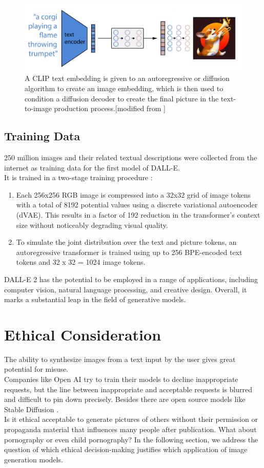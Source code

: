 \documentclass[11pt]{article}
\begin{document}
\begin{figure} [h]
	\includegraphics[width = 1\linewidth]{images/highLevel.png}
	\caption{A CLIP text embedding is given to an autoregressive or diffusion algorithm to create an image embedding, which is then used to condition a diffusion decoder to create the final picture in the text-to-image production process.[modified from \cite{CLIP}]}
	\label{example}
\end{figure}

\subsection{Training Data}
250 million images and their related textual descriptions were collected from the internet as training data for the first model of DALL-E.\\
It is trained in a two-stage training procedure \cite{zeroShot}:
\begin{enumerate}
	\item Each 256x256 RGB image is compressed into a 32x32 grid of image tokens with a total of 8192 potential values using a discrete variational autoencoder (dVAE). This results in a factor of 192 reduction in the transformer's context size without noticeably degrading visual quality.
	\item To simulate the joint distribution over the text and picture tokens, an autoregressive transformer is trained using up to 256 BPE-encoded text tokens and 32 x 32 = 1024 image tokens.
\end{enumerate}
DALL-E 2 has the potential to be employed in a range of applications, including computer vision, natural language processing, and creative design. Overall, it marks a substantial leap in the field of generative models.


\section{Ethical Consideration}
The ability to synthesize images from a text input by the user gives great potential for misuse. \\
Companies like Open AI try to train their models to decline inappropriate requests, but the line between inappropriate and acceptable requests is blurred and difficult to pin down precisely. Besides there are open source models like Stable Diffusion \cite{StableDiffusion}.\\
Is it ethical acceptable to generate pictures of others without their permission or propaganda material that influences many people after publication. What about pornography or even child pornography?
In the following section, we address the question of which ethical decision-making justifies which application of image generation models.
\end{document}
